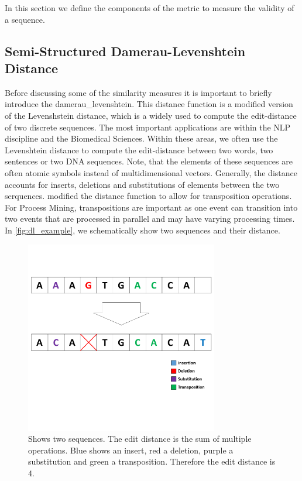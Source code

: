 \documentclass[./../../paper.tex]{subfiles}
\begin{document}
In this section we define the components of the metric to measure the validity of a sequence.

\subsection{Semi-Structured Damerau-Levenshtein Distance}
\label{sec:ssdld}
Before discussing some of the similarity measures it is important to briefly introduce the \gls{damerau_levenshtein}. This distance function is a modified version of the Levenshstein distance\autocite{levenshtein_Binarycodescapable_1965}, which is a widely used to compute the edit-distance of two discrete sequences\autocites{apostolico_SequenceAlignmentMolecular_1998,Mitton20101}. The most important applications are within the \gls{NLP} discipline and the Biomedical Sciences. Within these areas, we often use the Levenshtein distance to compute the edit-distance between two words, two sentences or two DNA sequences. Note, that the elements of these sequences are often atomic symbols instead of multidimensional vectors. Generally, the distance accounts for inserts, deletions and substitutions of elements between the two serquences.
\citeauthor{damerau_techniquecomputerdetection_1964} modified the distance function to allow for transposition operations. For Process Mining, transpositions are important as one event can transition into two events that are processed in parallel and may have varying processing times.
In \autoref{fig:dl_example}, we schematically show two sequences and their distance.


\begin{figure}[htb]
    \centering
    \includegraphics[width=0.75\textwidth]{figures/Graphics/Slide6.PNG}
    \caption{Shows two sequences. The edit distance is the sum of multiple operations. Blue shows an insert, red a deletion, purple a substitution and green a transposition. Therefore the edit distance is 4.}
    \label{fig:dl_example}
\end{figure}
\end{document}

